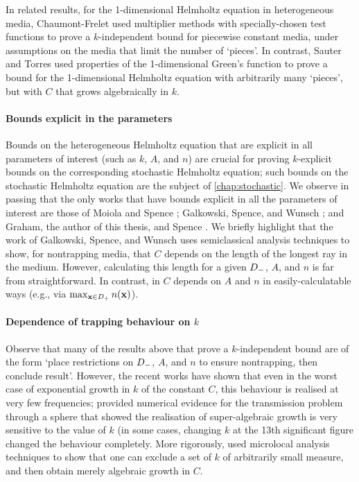 In related results, for the 1-dimensional Helmholtz equation in heterogeneous media, Chaumont-Frelet \cite[Section 2.1.5, Theorem 3]{Ch:15} used multiplier methods with specially-chosen test functions to prove a $k$-independent bound for piecewise constant media, under assumptions on the media that limit the number of `pieces'. In contrast, Sauter and Torres \cite{SaTo:18} used properties of the 1-dimensional Green's function to prove a bound for the 1-dimensional Helmholtz equation with arbitrarily many `pieces', but with $C$ that grows algebraically in $k$.

\paragraph{Bounds explicit in the parameters} Bounds on the heterogeneous Helmholtz equation that are explicit in all parameters of interest (such as $k$, $A$, and $n$) are crucial for proving $k$-explicit bounds on the corresponding stochastic Helmholtz equation; such bounds on the stochastic Helmholtz equation are the subject of \cref{chap:stochastic}. We observe in passing that the only works that have bounds explicit in all the parameters of interest are those of Moiola and Spence \cite{MoSp:19}; Galkowski, Spence, and Wunsch \cite{GaSpWu:18}; and Graham, the author of this thesis, and Spence \cite{GrPeSp:19}. We briefly highlight that the work of Galkowski, Spence, and Wunsch uses semiclassical analysis techniques to show, for nontrapping media, that $C$ depends on the length of the longest ray in the medium. However, calculating this length for a given $D_{-}$, $A$, and $n$ is far from straightforward. In contrast, in \cite{MoSp:19,GrPeSp:19} $C$ depends on $A$ and $n$ in easily-calculatable ways (e.g., via $\max_{\mathbf{x} \in D_{+}} n(\mathbf{x})$).

\paragraph{Dependence of trapping behaviour on $k$} Observe that many of the results above that prove a $k$-independent bound are of the form `place restrictions on $D_{-}$, $A$, and $n$ to ensure nontrapping, then conclude result'. However, the recent works \cite{MoSp:19,LaSpWu:19} have shown that even in the worst case of exponential growth in $k$ of the constant $C$, this behaviour is realised at very few frequencies; \cite{MoSp:19} provided numerical evidence for the transmission problem through a sphere that showed the realisation of super-algebraic growth is very sensitive to the value of $k$ (in some cases, changing $k$ at the 13th significant figure changed the behaviour completely. More rigorously, \cite{LaSpWu:19} used microlocal analysis techniques to show that one can exclude a set of $k$ of arbitrarily small measure, and then obtain merely algebraic growth in $C$.

